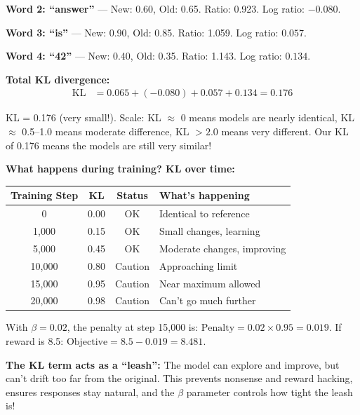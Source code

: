 \begin{chapterenv}
\textbf{Word 2: ``answer''} --- New: 0.60, Old: 0.65. Ratio: 0.923. Log ratio: $-0.080$.

\textbf{Word 3: ``is''} --- New: 0.90, Old: 0.85. Ratio: 1.059. Log ratio: $0.057$.

\textbf{Word 4: ``42''} --- New: 0.40, Old: 0.35. Ratio: 1.143. Log ratio: $0.134$.

\textbf{Total KL divergence:}
\begin{align*}
\text{KL} &= 0.065 + (-0.080) + 0.057 + 0.134 = 0.176
\end{align*}

\begin{tipbox}
KL = 0.176 (very small!). Scale: KL $\approx$ 0 means models are nearly identical, KL $\approx$ 0.5--1.0 means moderate difference, KL $> 2.0$ means very different. Our KL of 0.176 means the models are still very similar!
\end{tipbox}

\textbf{What happens during training? KL over time:}

\begin{center}
\begin{tabular}{cccl}
\toprule
\textbf{Training Step} & \textbf{KL} & \textbf{Status} & \textbf{What's happening} \\
\midrule
0 & 0.00 & OK & Identical to reference \\
1,000 & 0.15 & OK & Small changes, learning \\
5,000 & 0.45 & OK & Moderate changes, improving \\
10,000 & 0.80 & Caution & Approaching limit \\
15,000 & 0.95 & Caution & Near maximum allowed \\
20,000 & 0.98 & Caution & Can't go much further \\
\bottomrule
\end{tabular}
\end{center}

With $\beta = 0.02$, the penalty at step 15,000 is: $\text{Penalty} = 0.02 \times 0.95 = 0.019$. If reward is 8.5: $\text{Objective} = 8.5 - 0.019 = 8.481$.

\begin{infobox}
\textbf{The KL term acts as a ``leash'':} The model can explore and improve, but can't drift too far from the original. This prevents nonsense and reward hacking, ensures responses stay natural, and the $\beta$ parameter controls how tight the leash is!
\end{infobox}

\end{chapterenv}